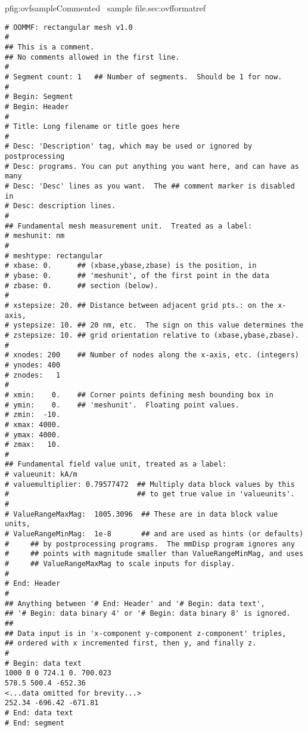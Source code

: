 \begin{codelisting}{p}{fig:ovfsample}{Commented \OVF\ sample
  file.}{sec:ovfformat}{ref}
\begin{verbatim}
# OOMMF: rectangular mesh v1.0
#
## This is a comment.
## No comments allowed in the first line.
#
# Segment count: 1   ## Number of segments.  Should be 1 for now.
#
# Begin: Segment
# Begin: Header
#
# Title: Long filename or title goes here
#
# Desc: 'Description' tag, which may be used or ignored by postprocessing
# Desc: programs. You can put anything you want here, and can have as many
# Desc: 'Desc' lines as you want.  The ## comment marker is disabled in
# Desc: description lines.
#
## Fundamental mesh measurement unit.  Treated as a label:
# meshunit: nm
#
# meshtype: rectangular
# xbase: 0.      ## (xbase,ybase,zbase) is the position, in
# ybase: 0.      ## 'meshunit', of the first point in the data
# zbase: 0.      ## section (below).
#
# xstepsize: 20. ## Distance between adjacent grid pts.: on the x-axis,
# ystepsize: 10. ## 20 nm, etc.  The sign on this value determines the
# zstepsize: 10. ## grid orientation relative to (xbase,ybase,zbase).
#
# xnodes: 200    ## Number of nodes along the x-axis, etc. (integers)
# ynodes: 400
# znodes:   1
#
# xmin:    0.    ## Corner points defining mesh bounding box in
# ymin:    0.    ## 'meshunit'.  Floating point values.
# zmin:  -10.
# xmax: 4000.
# ymax: 4000.
# zmax:   10.
#
## Fundamental field value unit, treated as a label:
# valueunit: kA/m
# valuemultiplier: 0.79577472  ## Multiply data block values by this
#                              ## to get true value in 'valueunits'.
#
# ValueRangeMaxMag:  1005.3096  ## These are in data block value units,
# ValueRangeMinMag:  1e-8       ## and are used as hints (or defaults)
#     ## by postprocessing programs.  The mmDisp program ignores any
#     ## points with magnitude smaller than ValueRangeMinMag, and uses
#     ## ValueRangeMaxMag to scale inputs for display.
#
# End: Header
#
## Anything between '# End: Header' and '# Begin: data text',
## '# Begin: data binary 4' or '# Begin: data binary 8' is ignored.
##
## Data input is in 'x-component y-component z-component' triples,
## ordered with x incremented first, then y, and finally z.
#
# Begin: data text
1000 0 0 724.1 0. 700.023
578.5 500.4 -652.36
<...data omitted for brevity...>
252.34 -696.42 -671.81
# End: data text
# End: segment
\end{verbatim}
\end{codelisting}

